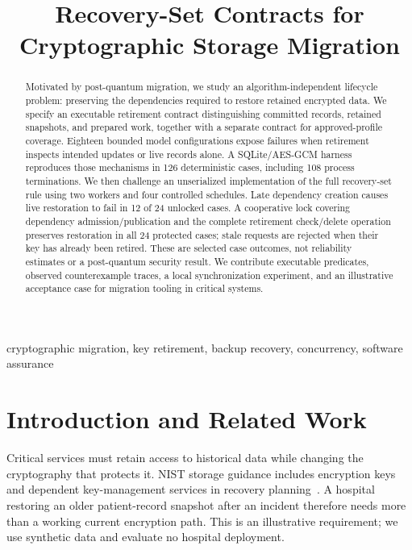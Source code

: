\documentclass[10pt,conference]{IEEEtran}
\begin{document}
\title{Recovery-Set Contracts for Cryptographic Storage Migration}
\author{
}
\maketitle
\begin{abstract}
Motivated by post-quantum migration, we study an algorithm-independent lifecycle problem: preserving the dependencies required to restore retained encrypted data. We specify an executable retirement contract distinguishing committed records, retained snapshots, and prepared work, together with a separate contract for approved-profile coverage. Eighteen bounded model configurations expose failures when retirement inspects intended updates or live records alone. A SQLite/AES-GCM harness reproduces those mechanisms in 126 deterministic cases, including 108 process terminations. We then challenge an unserialized implementation of the full recovery-set rule using two workers and four controlled schedules. Late dependency creation causes live restoration to fail in 12 of 24 unlocked cases. A cooperative lock covering dependency admission/publication and the complete retirement check/delete operation preserves restoration in all 24 protected cases; stale requests are rejected when their key has already been retired. These are selected case outcomes, not reliability estimates or a post-quantum security result. We contribute executable predicates, observed counterexample traces, a local synchronization experiment, and an illustrative acceptance case for migration tooling in critical systems.
\end{abstract}
\begin{IEEEkeywords}
cryptographic migration, key retirement, backup recovery, concurrency, software assurance
\end{IEEEkeywords}

\section{Introduction and Related Work}
Critical services must retain access to historical data while changing the cryptography that protects it. NIST storage guidance includes encryption keys and dependent key-management services in recovery planning~\cite{storage}. A hospital restoring an older patient-record snapshot after an incident therefore needs more than a working current encryption path. This is an illustrative requirement; we use synthetic data and evaluate no hospital deployment.
\end{document}
